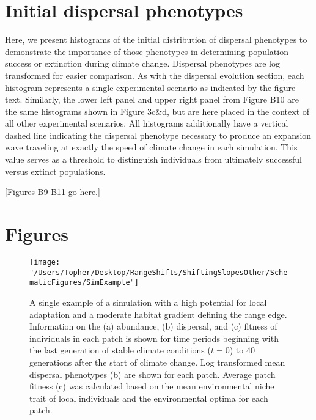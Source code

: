 \documentclass[11pt]{article}
\begin{document}
\section*{Initial dispersal phenotypes}
Here, we present histograms of the initial distribution of dispersal phenotypes to demonstrate the importance of those phenotypes in determining population success or extinction during climate change. Dispersal phenotypes are log transformed for easier comparison. As with the dispersal evolution section, each histogram represents a single experimental scenario as indicated by the figure text. Similarly, the lower left panel and upper right panel from Figure B10 are the same histograms shown in Figure 3c\&d, but are here placed in the context of all other experimental scenarios. All histograms additionally have a vertical dashed line indicating the dispersal phenotype necessary to produce an expansion wave traveling at exactly the speed of climate change in each simulation. This value serves as a threshold to distinguish individuals from ultimately successful versus extinct populations.

[Figures B9-B11 go here.]

\newpage{}





\newpage{}

\section*{Figures}

\begin{figure}[h!]
\texttt{[image: "/Users/Topher/Desktop/RangeShifts/ShiftingSlopesOther/SchematicFigures/SimExample"]}
\caption{A single example of a simulation with a high potential for local adaptation and a moderate habitat gradient defining the range edge. Information on the (a) abundance, (b) dispersal, and (c) fitness of individuals in each patch is shown for time periods beginning with the last generation of stable climate conditions ($t = 0$) to $40$ generations after the start of climate change. Log transformed mean dispersal phenotypes (b) are shown for each patch. Average patch fitness (c) was calculated based on the mean environmental niche trait of local individuals and the environmental optima for each patch.}
\label{fig:SimExample}
\end{figure}
\end{document}
